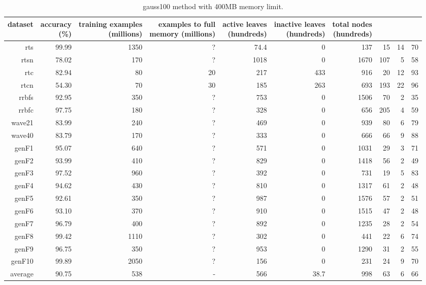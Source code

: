 \clearpage
\begin{table}
\caption{{\sc gauss100} method with 400MB memory limit.}
\label{tab:gauss100-400MB}
\centering
\begin{tabular}{|r|r|r|r|r|r|r|r|r|r|}
\hline
dataset	&
\rotatebox{90}{\parbox{9em}{accuracy\\(\%)}} &
\rotatebox{90}{\parbox{9em}{training examples\\(millions)}} &
\rotatebox{90}{\parbox{9em}{examples to full\\memory (millions)}} &
\rotatebox{90}{\parbox{9em}{active leaves\\(hundreds)}} &
\rotatebox{90}{\parbox{9em}{inactive leaves\\(hundreds)}} &
\rotatebox{90}{\parbox{9em}{total nodes\\(hundreds)}} &
\rotatebox{90}{\parbox{9em}{tree depth}}	&
\rotatebox{90}{\parbox{9em}{training speed (\%)}} &
\rotatebox{90}{\parbox{9em}{prediction speed (\%)}} \\
\hline
{\sc rts} & 99.99 & 1350 & ? & 74.4 & 0 & 137 & 15 & 14 & 70 \\
{\sc rtsn} & 78.02 & 170 & ? & 1018 & 0 & 1670 & 107 & 5 & 58 \\
{\sc rtc} & 82.94 & 80 & 20 & 217 & 433 & 916 & 20 & 12 & 93 \\
{\sc rtcn} & 54.30 & 70 & 30 & 185 & 263 & 693 & 193 & 22 & 96 \\
{\sc rrbfs} & 92.95 & 350 & ? & 753 & 0 & 1506 & 70 & 2 & 35 \\
{\sc rrbfc} & 97.75 & 180 & ? & 328 & 0 & 656 & 205 & 4 & 59 \\
{\sc wave21} & 83.99 & 240 & ? & 469 & 0 & 939 & 80 & 6 & 79 \\
{\sc wave40} & 83.79 & 170 & ? & 333 & 0 & 666 & 66 & 9 & 88 \\
{\sc genF1} & 95.07 & 640 & ? & 571 & 0 & 1031 & 29 & 3 & 71 \\
{\sc genF2} & 93.99 & 410 & ? & 829 & 0 & 1418 & 56 & 2 & 49 \\
{\sc genF3} & 97.52 & 960 & ? & 392 & 0 & 731 & 19 & 5 & 83 \\
{\sc genF4} & 94.62 & 430 & ? & 810 & 0 & 1317 & 61 & 2 & 48 \\
{\sc genF5} & 92.61 & 350 & ? & 987 & 0 & 1576 & 57 & 2 & 51 \\
{\sc genF6} & 93.10 & 370 & ? & 910 & 0 & 1515 & 47 & 2 & 48 \\
{\sc genF7} & 96.79 & 400 & ? & 892 & 0 & 1235 & 28 & 2 & 54 \\
{\sc genF8} & 99.42 & 1110 & ? & 302 & 0 & 441 & 22 & 6 & 74 \\
{\sc genF9} & 96.75 & 350 & ? & 953 & 0 & 1290 & 31 & 2 & 55 \\
{\sc genF10} & 99.89 & 2050 & ? & 156 & 0 & 231 & 24 & 9 & 70 \\
\hline
average & 90.75 & 538 &  -  & 566 & 38.7 & 998 & 63 & 6 & 66 \\
\hline
\end{tabular}
\end{table}
\clearpage
